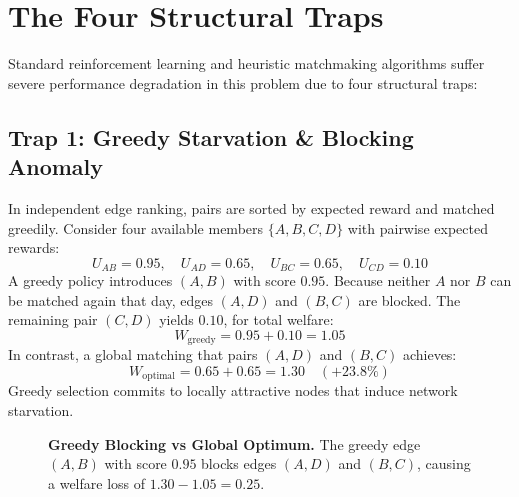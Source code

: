 \documentclass[10pt,twocolumn,letterpaper]{article}
\begin{document}
\section{The Four Structural Traps}
\label{sec:traps}

Standard reinforcement learning and heuristic matchmaking algorithms suffer severe performance degradation in this problem due to four structural traps:

\subsection{Trap 1: Greedy Starvation \& Blocking Anomaly}
In independent edge ranking, pairs are sorted by expected reward and matched greedily. Consider four available members $\{A, B, C, D\}$ with pairwise expected rewards:
\begin{equation}
U_{AB} = 0.95, \quad U_{AD} = 0.65, \quad U_{BC} = 0.65, \quad U_{CD} = 0.10
\end{equation}
A greedy policy introduces $(A, B)$ with score $0.95$. Because neither $A$ nor $B$ can be matched again that day, edges $(A, D)$ and $(B, C)$ are blocked. The remaining pair $(C, D)$ yields $0.10$, for total welfare:
\begin{equation}
W_{\text{greedy}} = 0.95 + 0.10 = 1.05
\end{equation}
In contrast, a global matching that pairs $(A, D)$ and $(B, C)$ achieves:
\begin{equation}
W_{\text{optimal}} = 0.65 + 0.65 = 1.30 \quad (+23.8\%)
\end{equation}
Greedy selection commits to locally attractive nodes that induce network starvation.

\begin{figure}[h]
\centering
{}
\caption{\textbf{Greedy Blocking vs Global Optimum.} The greedy edge $(A, B)$ with score $0.95$ blocks edges $(A, D)$ and $(B, C)$, causing a welfare loss of $1.30 - 1.05 = 0.25$.}
\label{fig:blocking}
\end{figure}
\end{document}
